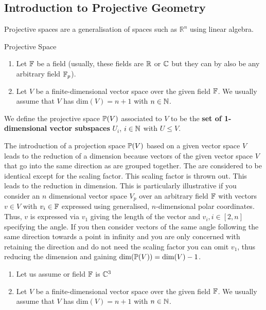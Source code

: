 \subsection{Introduction to Projective Geometry}

Projective spaces are a generalisation of spaces such as $\mathbb{R}^n$ using linear algebra. \\

\begin{definitionBox}{Projective Space}
    
    \begin{enumerate}
        \item Let $\mathbb{F}$ be a field (usually, these fields are $\mathbb{R}$ or $\mathbb{C}$ but they can by also be any arbitrary field $\mathbb{F}_p$).
        \item Let $V$ be a finite-dimensional vector space over the given field $\mathbb{F}$. We usually assume that $V$ has $\mathrm{dim}(V) = n +1$ with $n \in \mathbb{N}$.
    \end{enumerate}  

    We define the projective space $\mathbb{P}(V)$ associated to $V$ to be the \textbf{set of 1-dimensional vector subspaces} $U_i$, $i \in \mathbb{N}$ with $U \leq V$.
\end{definitionBox}

\vspace{0.5cm}

The introduction of a projection space $\mathbb{P}(V)$ based on a given vector space $V$ leads to the reduction of a dimension because vectors of the given vector space $V$ that go into the same direction as are grouped together. The are considered to be identical except for the scaling factor. This scaling factor is thrown out. This leads to the reduction in dimension. This is particularly illustrative if you consider an $n$ dimensional vector space $V_p$ over an arbitrary field $\mathbb{F}$ with vectors $v\in V$ with $v_i \in \mathbb{F}$ expressed using generalised, $n$-dimensional polar coordinates. Thus, $v$ is expressed via $v_1$ giving the length of the vector and $v_i, i \in [2,n]$ specifying the angle. If you then consider vectors of the same angle following the same direction towards a point in infinity and you are only concerned with retaining the direction and do not need the scaling factor you can omit $v_1$, thus reducing the dimension and gaining $\mathrm{dim}(\mathbb{P}(V)) = \mathrm{dim}(V) - 1$. 

\begin{exampleBox}
    \begin{enumerate}
        \item Let us assume or field $\mathbb{F}$ is $\mathbb{C}^3$
        \item Let $V$ be a finite-dimensional vector space over the given field $\mathbb{F}$. We usually assume that $V$ has $\mathrm{dim}(V) = n +1$ with $n \in \mathbb{N}$.
    \end{enumerate}  
\end{exampleBox}
